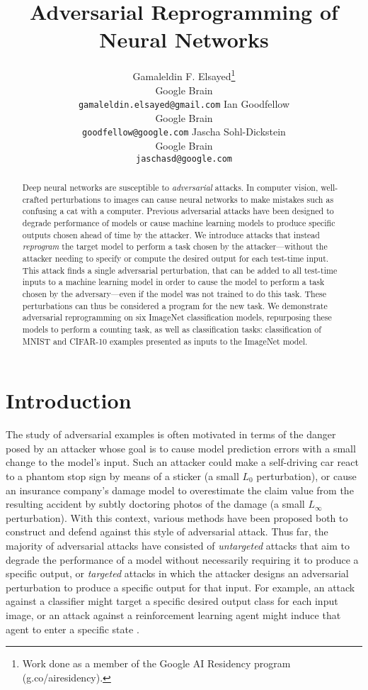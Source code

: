 \documentclass{article}
\title{Adversarial Reprogramming of \\ Neural Networks}
\author{Gamaleldin F. Elsayed\thanks{Work done as a member of the Google AI Residency program (g.co/airesidency).} \\
  Google Brain\\
  \texttt{gamaleldin.elsayed@gmail.com}
  \And
Ian Goodfellow \\
Google Brain \\
\texttt{goodfellow@google.com}
\And
Jascha Sohl-Dickstein\\
Google Brain\\
\texttt{jaschasd@google.com}
}
\begin{document}
\maketitle


\begin{abstract}
Deep neural networks are susceptible to \emph{adversarial} attacks. 
In computer vision, well-crafted perturbations to images can cause
neural networks to make mistakes such as confusing a cat with a computer.
Previous adversarial attacks have been designed to degrade performance
of models or cause machine learning models to produce specific outputs chosen
ahead of time by the attacker.
We introduce attacks that instead {\em reprogram} the target model
to perform a task chosen by the attacker---without the attacker needing
to specify or compute the desired output for each test-time input.
This attack finds a single adversarial perturbation, that can be added to all test-time inputs to
a machine learning model in order to cause the model to perform a task chosen by
the adversary---even if the model was not
trained to do this task.
These perturbations can thus be considered a program for the new task. 
We demonstrate adversarial reprogramming on six ImageNet classification models,
repurposing these models to perform a counting task, as well as classification
tasks: classification of MNIST and CIFAR-10 examples presented as inputs
to the ImageNet model.

\end{abstract}

\section{Introduction}

The study of adversarial examples is often motivated in terms of the danger posed by an attacker whose goal is to cause model prediction errors with a small change to the model's input. 
Such an attacker could make a self-driving car react to a phantom stop sign \citep{evtimov2017robust} by means of a sticker (a small $L_{0}$ perturbation), or cause an insurance company's damage model to overestimate the claim value from the resulting accident by subtly doctoring photos of the damage (a small $L_\infty$ perturbation). 
With this context, 
various methods have been proposed both to construct \citep{szegedy2013intriguing, papernot2015limitations, papernot2017practical, papernot2016transferability, brown2017adversarial, liu2016delving} and defend against
 \citep{goodfellow2014explaining,kurakin2016mlatscale,madry2017towards,ensemble_training, kolter2017provable, kannan2018adversarial} this style of adversarial attack. 
Thus far, the majority of adversarial attacks have consisted of {\em untargeted}
 attacks that aim to degrade the performance of a model without necessarily
 requiring it to produce a specific output, or {\em targeted} attacks
 in which the attacker designs an adversarial perturbation to produce
 a specific output for that input.
 For example, an attack against a classifier might target a specific desired output class for
 each input image, or an attack against a reinforcement learning agent might induce
 that agent to enter a specific state \citep{lin2017tactics}.
 
\end{document}
